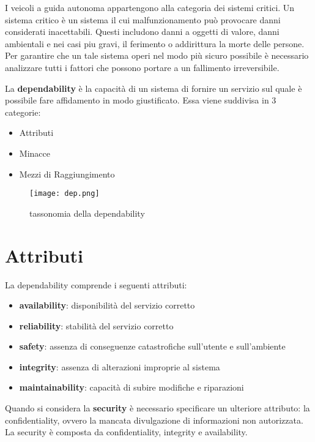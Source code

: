 \cite{tax}
I veicoli a guida autonoma appartengono alla categoria dei sistemi critici. Un sistema critico è un sistema il cui malfunzionamento può provocare danni
considerati inacettabili. Questi includono danni a oggetti di valore, danni ambientali e nei casi piu gravi, il ferimento o addirittura la morte delle persone.
Per garantire che un tale sistema operi nel modo più sicuro possibile è necessario analizzare tutti i fattori che possono portare a  un fallimento irreversibile.

La \textbf{dependability} è la capacità di un sistema di fornire un servizio sul quale è possibile fare affidamento in modo giustificato.
Essa viene suddivisa in 3 categorie:
\begin{itemize}
    \item Attributi
    \item Minacce
    \item Mezzi di Raggiungimento
\end{itemize}
\begin{figure}[h]
    \texttt{[image: dep.png]}
    \caption{tassonomia  della dependability\cite{dep}}
    \label{fig:dep}
\end{figure}
\section{Attributi}
La dependability comprende i seguenti attributi:
\begin{itemize}
    \item \textbf{availability}: disponibilità del servizio corretto
    \item \textbf{reliability}: stabilità del servizio corretto
    \item \textbf{safety}: assenza di conseguenze catastrofiche sull'utente e sull'ambiente
    \item \textbf{integrity}: assenza di alterazioni improprie al sistema
    \item \textbf{maintainability}: capacità di subire modifiche e riparazioni
\end{itemize}
Quando si considera la \textbf{security} è necessario specificare un ulteriore attributo: la confidentiality, ovvero la mancata divulgazione di informazioni non 
autorizzata. La security è composta da confidentiality, integrity e availability.
